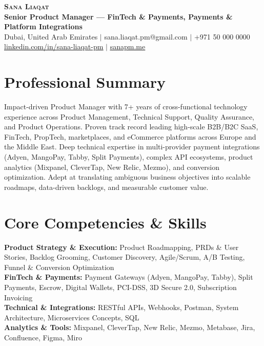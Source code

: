 \documentclass[letterpaper,10pt]{article}
\begin{document}
\begin{center}
    \textbf{\Huge \scshape Sana Liaqat} \\ \vspace{2pt}
    \textbf{\large Senior Product Manager — FinTech \& Payments, Payments \& Platform Integrations} \\ \vspace{2pt}
    \small Dubai, United Arab Emirates $|$ sana.liaqat.pm@gmail.com $|$ +971 50 000 0000 \\
    \href{https://linkedin.com/in/sana-liaqat-pm}{\underline{linkedin.com/in/sana-liaqat-pm}} $|$ 
    \href{https://sanapm.me}{\underline{sanapm.me}}
\end{center}

\section{Professional Summary}
\small{
Impact-driven Product Manager with 7+ years of cross-functional technology experience across Product Management, Technical Support, Quality Assurance, and Product Operations. Proven track record leading high-scale B2B/B2C SaaS, FinTech, PropTech, marketplaces, and eCommerce platforms across Europe and the Middle East. Deep technical expertise in multi-provider payment integrations (Adyen, MangoPay, Tabby, Split Payments), complex API ecosystems, product analytics (Mixpanel, CleverTap, New Relic, Mezmo), and conversion optimization. Adept at translating ambiguous business objectives into scalable roadmaps, data-driven backlogs, and measurable customer value.
}

\section{Core Competencies \& Skills}
\begin{itemize}[leftmargin=0.15in, label={}]
    \small{\item{
     \textbf{Product Strategy \& Execution:} Product Roadmapping, PRDs \& User Stories, Backlog Grooming, Customer Discovery, Agile/Scrum, A/B Testing, Funnel \& Conversion Optimization \\
     \textbf{FinTech \& Payments:} Payment Gateways (Adyen, MangoPay, Tabby), Split Payments, Escrow, Digital Wallets, PCI-DSS, 3D Secure 2.0, Subscription Invoicing \\
     \textbf{Technical \& Integrations:} RESTful APIs, Webhooks, Postman, System Architecture, Microservices Concepts, SQL \\
     \textbf{Analytics \& Tools:} Mixpanel, CleverTap, New Relic, Mezmo, Metabase, Jira, Confluence, Figma, Miro
    }}
\end{itemize}
\end{document}
